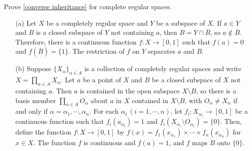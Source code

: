 \begin{prob}
    Prove \cref{converse inheritance} for complete regular spaces.
\end{prob}
\begin{enumerate}
    \item[(a)]{
        Let $X$ be a completely regular space and $Y$ be a subspace of $X$.
        If $a\in Y$ and $B$ is a closed subspace of $Y$ not containing $a$, then $B=Y\cap\overline{B}$, so $a\notin\overline{B}$.
        Therefore, there is a continuous function $f: X\rightarrow[0, 1]$ such that $f(a)=0$ and $f(\overline{B})=\{1\}$.
        The restriction of $f$ on $Y$ separates $a$ and $B$.
    }
    \item[(b)]{
        Suppose $\{X_\alpha\}_{\alpha\in A}$ is a collection of completely regular spaces and write $X=\prod_{\alpha\in A}X_\alpha$.
        Let $a$ be a point of $X$ and $B$ be a closed subspace of $X$ not containing $a$.
        Then $a$ is contained in the open subspace $X\setminus B$, so there is a basis member $\prod_{\alpha\in A} O_\alpha$ about $a$ in $X$ contained in $X\setminus B$, with $O_\alpha\neq X_\alpha$ if and only if $\alpha=\alpha_1, \cdots, \alpha_n$.
        For each $\alpha_i\,(i=1, \cdots, n)$, let $f_i: X_{\alpha_i}\rightarrow[0, 1]$ be a continuous function such that $f_i(a_{\alpha_i})=1$ and $f_i(X_{\alpha_i}\setminus O_{\alpha_i})=\{0\}$.
        Then, define the function $f: X\rightarrow[0, 1]$ by $f(x)=f_1(x_{\alpha_1})\times\cdots\times f_n(x_{\alpha_n})$ for $x\in X$.
        The function $f$ is continuous and $f(a)=1$, and $f$ maps $B$ onto $\{0\}$.
    }
\end{enumerate}

